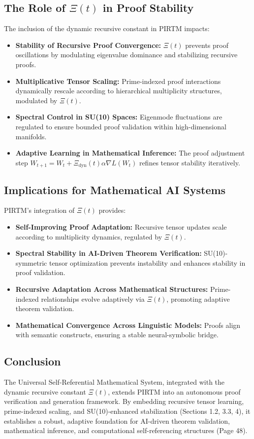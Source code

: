 \documentclass{article}
\theoremstyle{plain}
\begin{document}
\subsection{The Role of \(\Xi(t) \) in Proof Stability}
The inclusion of the dynamic recursive constant in PIRTM impacts:
\begin{itemize}
    \item \textbf{Stability of Recursive Proof Convergence:} \(\Xi(t) \) prevents proof oscillations by modulating eigenvalue dominance and stabilizing recursive proofs.
    \item \textbf{Multiplicative Tensor Scaling:} Prime-indexed proof interactions dynamically rescale according to hierarchical multiplicity structures, modulated by \(\Xi(t) \).
    \item \textbf{Spectral Control in SU(10) Spaces:} Eigenmode fluctuations are regulated to ensure bounded proof validation within high-dimensional manifolds.
    \item \textbf{Adaptive Learning in Mathematical Inference:} The proof adjustment step \( W_{t+1} = W_t + \Xi_{\text{dyn}}(t) \alpha \nabla L(W_t) \) refines tensor stability iteratively.
\end{itemize}

\subsection{Implications for Mathematical AI Systems}
PIRTM’s integration of \(\Xi(t) \) provides:
\begin{itemize}
    \item \textbf{Self-Improving Proof Adaptation:} Recursive tensor updates scale according to multiplicity dynamics, regulated by \(\Xi(t) \).
    \item \textbf{Spectral Stability in AI-Driven Theorem Verification:} SU(10)-symmetric tensor optimization prevents instability and enhances stability in proof validation.
    \item \textbf{Recursive Adaptation Across Mathematical Structures:} Prime-indexed relationships evolve adaptively via \(\Xi(t) \), promoting adaptive theorem validation.
    \item \textbf{Mathematical Convergence Across Linguistic Models:} Proofs align with semantic constructs, ensuring a stable neural-symbolic bridge.
\end{itemize}

\subsection{Conclusion}
The Universal Self-Referential Mathematical System, integrated with the dynamic recursive constant \(\Xi(t) \), extends PIRTM into an autonomous proof verification and generation framework. By embedding recursive tensor learning, prime-indexed scaling, and SU(10)-enhanced stabilization (Sections 1.2, 3.3, 4), it establishes a robust, adaptive foundation for AI-driven theorem validation, mathematical inference, and computational self-referencing structures (Page 48).
\end{document}
